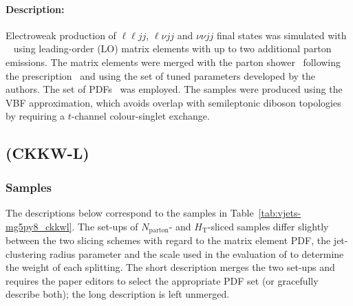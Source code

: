 \paragraph{Description:}

Electroweak production of $\ell\ell jj$, $\ell\nu jj$ and $\nu\nu jj$ final states
was simulated with \SHERPA[2.2.1]~\cite{Bothmann:2019yzt} using 
leading-order (LO) matrix elements with up to two additional parton emissions. 
The matrix elements were merged with the \SHERPA parton
shower~\cite{Schumann:2007mg} following the \MEPSatLO
prescription~\cite{Catani:2001cc} and using the set of tuned
parameters developed by the \SHERPA authors.  The \NNPDF[3.0nnlo] set of
PDFs~\cite{Ball:2014uwa} was employed. The samples were produced
using the VBF approximation, which avoids overlap  with semileptonic
diboson topologies by requiring a $t$-channel colour-singlet exchange.







\subsection[MadGraph5 (CKKW-L)]{\MADGRAPH (CKKW-L)}

\subsubsection*{Samples}

The descriptions below correspond to the samples in
Table~\ref{tab:vjets-mg5py8_ckkwl}. The set-ups of $N_\text{parton}$- and
$H_\text{T}$-sliced samples differ slightly between the two slicing schemes 
with regard to the matrix element PDF, the jet-clustering radius parameter 
and the scale used in the evaluation of  \alphas to determine the weight of
each splitting. The short description merges the two set-ups and requires 
the paper editors to select the appropriate PDF set (or gracefully describe 
both); the long description is left unmerged. 

